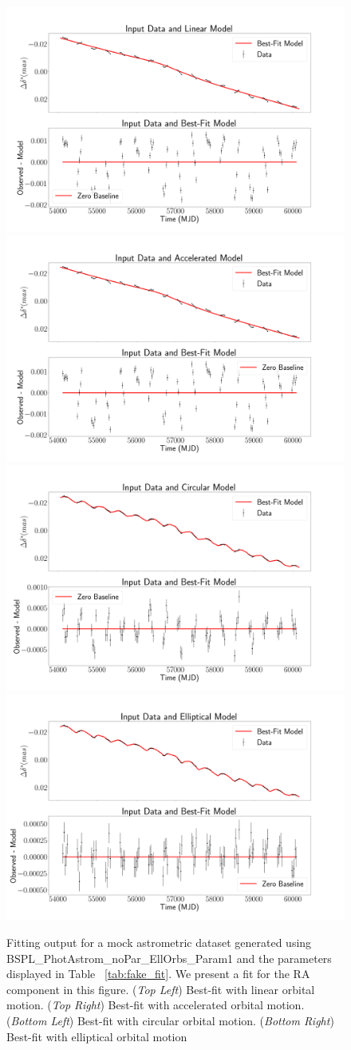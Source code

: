 \documentclass[twocolumn]{aastex701}
\begin{document}
\begin{figure}
    \centering
    \includegraphics[width= .48 \textwidth]{figures/LinAnalAst2.png}
    \includegraphics[width= .48 \textwidth]{figures/AccAnalAst2.png}
    \includegraphics[width= .48\textwidth]{figures/CircAnalAst2.png}
    \includegraphics[width= .48\textwidth]{figures/EllAnalAst2.png}

    \caption{Fitting output for a mock astrometric dataset generated using  BSPL\_PhotAstrom\_noPar\_EllOrbs\_Param1 and the parameters displayed in Table ~\ref{tab:fake_fit}. We present a fit for the RA component in this figure. 
    (\emph{Top Left}) Best-fit with linear orbital motion. (\emph{Top Right}) Best-fit with accelerated orbital motion. (\emph{Bottom Left}) Best-fit with circular orbital motion. (\emph{Bottom Right}) Best-fit with elliptical orbital motion}
    \label{fig:orbital_comparison_as2}
\end{figure}
\end{document}
